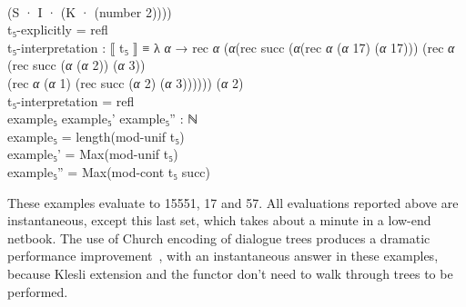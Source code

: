 \documentclass{entcs} \usepackage{prentcsmacro}
\newcommand{\AgdaFontStyle}[1]{\textsf{#1}}
\newcommand{\AgdaBoundFontStyle}[1]{\textit{#1}}
\newcommand{\AgdaNumber}      [1]{\textcolor{AgdaNumber}{#1}}
\newcommand{\AgdaSymbol}      [1]{\textcolor{AgdaSymbol}{#1}}
\newcommand{\AgdaBound}    [1]{\AgdaBoundFontStyle{\textcolor{AgdaBound}{#1}}}
\newcommand{\AgdaInductiveConstructor}[1]
    {\AgdaFontStyle{\textcolor{AgdaInductiveConstructor}{#1}}}
\newcommand{\AgdaDatatype} [1]{\AgdaFontStyle{\textcolor{AgdaDatatype}{#1}}}
\newcommand{\AgdaFunction} [1]{\AgdaFontStyle{\textcolor{AgdaFunction}{#1}}}
\newcommand{\AgdaIndent}[1]{\quad}
\newcommand{\AgdaCodeStyle}{\small}
\newenvironment{code}%
{\noindent\AgdaCodeStyle\pboxed}%
{\endpboxed\par\noindent%
\ignorespacesafterend}
\begin{document}
\begin{code}
\>[107]\<%
\\
\>[0]\AgdaIndent{21}{}\<[21]%
\>[21]\AgdaSymbol{(}\AgdaInductiveConstructor{S} \AgdaInductiveConstructor{·} \AgdaFunction{I} \AgdaInductiveConstructor{·} \AgdaSymbol{(}\AgdaInductiveConstructor{K} \AgdaInductiveConstructor{·} \AgdaSymbol{(}\AgdaFunction{number} \AgdaNumber{2}\AgdaSymbol{))))} \<[49]%
\>[49]\<%
\\
\>\AgdaFunction{t₅-explicitly} \AgdaSymbol{=} \AgdaInductiveConstructor{refl}\<%
\\
\>\AgdaFunction{t₅-interpretation} \AgdaSymbol{:} \AgdaFunction{⟦} \AgdaFunction{t₅} \AgdaFunction{⟧} \AgdaDatatype{≡} \AgdaSymbol{λ} \AgdaBound{α} \AgdaSymbol{→} \AgdaFunction{rec} \AgdaBound{α} \AgdaSymbol{(}\AgdaBound{α}\AgdaSymbol{(}\AgdaFunction{rec} \AgdaInductiveConstructor{succ} \AgdaSymbol{(}\AgdaBound{α}\AgdaSymbol{(}\AgdaFunction{rec} \AgdaBound{α} \AgdaSymbol{(}\AgdaBound{α} \AgdaNumber{17}\AgdaSymbol{)} \AgdaSymbol{(}\AgdaBound{α} \AgdaNumber{17}\AgdaSymbol{)))} \AgdaSymbol{(}\AgdaFunction{rec} \AgdaBound{α} \AgdaSymbol{(}\AgdaFunction{rec} \AgdaInductiveConstructor{succ} \AgdaSymbol{(}\AgdaBound{α} \AgdaSymbol{(}\AgdaBound{α} \AgdaNumber{2}\AgdaSymbol{))} \AgdaSymbol{(}\AgdaBound{α} \AgdaNumber{3}\AgdaSymbol{))} \<[112]%
\>[112]\<%
\\
\>[21]\AgdaIndent{34}{}\<[34]%
\>[34]\AgdaSymbol{(}\AgdaFunction{rec} \AgdaBound{α} \AgdaSymbol{(}\AgdaBound{α} \AgdaNumber{1}\AgdaSymbol{)} \AgdaSymbol{(}\AgdaFunction{rec} \AgdaInductiveConstructor{succ} \AgdaSymbol{(}\AgdaBound{α} \AgdaNumber{2}\AgdaSymbol{)} \AgdaSymbol{(}\AgdaBound{α} \AgdaNumber{3}\AgdaSymbol{))))))} \AgdaSymbol{(}\AgdaBound{α} \AgdaNumber{2}\AgdaSymbol{)} \<[80]%
\>[80]\<%
\\
\>\AgdaFunction{t₅-interpretation} \AgdaSymbol{=} \AgdaInductiveConstructor{refl} \<[25]%
\>[25]\<%
\\
\>\AgdaFunction{example₅} \AgdaFunction{example₅'} \AgdaFunction{example₅''} \AgdaSymbol{:} \AgdaDatatype{ℕ} \<[34]%
\>[34]\<%
\\
\>\AgdaFunction{example₅} \AgdaSymbol{=} \AgdaFunction{length}\AgdaSymbol{(}\AgdaFunction{mod-unif} \AgdaFunction{t₅}\AgdaSymbol{)} \<[31]%
\>[31]\<%
\\
\>\AgdaFunction{example₅'} \AgdaSymbol{=} \AgdaFunction{Max}\AgdaSymbol{(}\AgdaFunction{mod-unif} \AgdaFunction{t₅}\AgdaSymbol{)} \<[29]%
\>[29]\<%
\\
\>\AgdaFunction{example₅''} \AgdaSymbol{=} \AgdaFunction{Max}\AgdaSymbol{(}\AgdaFunction{mod-cont} \AgdaFunction{t₅} \AgdaInductiveConstructor{succ}\AgdaSymbol{)} \<[35]%
\>[35]\<%
\\
\>\<\end{code} 
These examples evaluate to 15551, 17 and 57.  All evaluations reported
above are instantaneous, except this last set, which takes about a
minute in a low-end netbook. The use of Church encoding of dialogue
trees produces a dramatic performance
improvement~\cite{escardo:dialogue}, with an instantaneous answer in
these examples, because Klesli extension and the functor don't need to
walk through trees to be performed.
\end{document}
